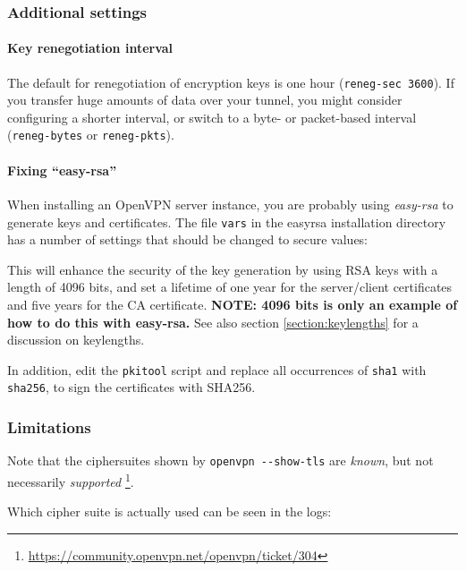 

\subsubsection{Additional settings}

\paragraph{Key renegotiation interval}
The default for renegotiation of encryption keys is one hour
(\verb|reneg-sec 3600|). If you
transfer huge amounts of data over your tunnel, you might consider
configuring a shorter interval, or switch to a byte- or packet-based
interval (\verb|reneg-bytes| or \verb|reneg-pkts|).

\paragraph{Fixing ``easy-rsa''}
When installing an OpenVPN server instance, you are probably using
\emph{easy-rsa} to generate keys and certificates.
The file \verb|vars| in the easyrsa installation directory has a
number of settings that should be changed to secure values:



This will enhance the security of the key generation by using RSA keys
with a length of 4096 bits, and set a lifetime of one year for the
server/client certificates and five years for the CA certificate. \textbf{NOTE: 4096 bits is only an example of how to do this with easy-rsa.} See also section \ref{section:keylengths} for a discussion on keylengths.

In addition, edit the \verb|pkitool| script and replace all occurrences
of \verb|sha1| with \verb|sha256|, to sign the certificates with
SHA256.

\subsubsection{Limitations}
Note that the ciphersuites shown by \verb|openvpn --show-tls| are \emph{known}, but not necessarily \emph{supported} \footnote{\url{https://community.openvpn.net/openvpn/ticket/304}}.

Which cipher suite is actually used can be seen in the logs:

